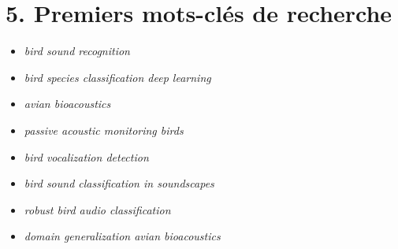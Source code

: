 \documentclass[11pt,a4paper]{article}
\begin{document}
\section*{5. Premiers mots-clés de recherche}
\begin{itemize}
    \item \textit{bird sound recognition}
    \item \textit{bird species classification deep learning}
    \item \textit{avian bioacoustics}
    \item \textit{passive acoustic monitoring birds}
    \item \textit{bird vocalization detection}
    \item \textit{bird sound classification in soundscapes}
    \item \textit{robust bird audio classification}
    \item \textit{domain generalization avian bioacoustics}
\end{itemize}
\end{document}
